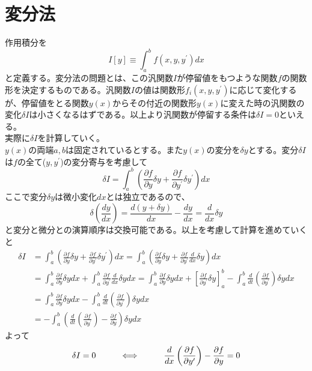 \documentclass{jsarticle}
\begin{document}
\section{変分法}
\noindent
作用積分を
\begin{equation}
I[y]\equiv\int_{a}^{b}f(x,y,y^{\prime})dx
\end{equation}
と定義する。変分法の問題とは、この汎関数\(I\)が停留値をもつような関数\(f\)の関数形を決定するものである。汎関数\(I\)の値は関数形\(f_{i}(x,y,y^{\prime})\)に応じて変化するが、停留値をとる関数\(y(x)\)からその付近の関数形\(y(x)\)に変えた時の汎関数の変化\(\delta I\)は小さくなるはずである。以上より汎関数が停留する条件は\(\delta I=0\)といえる。\\
実際に\(\delta I\)を計算していく。\\
\(y(x)\)の両端\(a,b\)は固定されているとする。また\(y(x)\)の変分を\(\delta y\)とする。変分\(\delta I\)は\(f\)の全て(\(y,y^{\prime}\))の変分寄与を考慮して
\[\delta I=\int_{a}^{b}\left(\frac{\partial f}{\partial y}\delta y+\frac{\partial f}{\partial y^{\prime}}\delta y^{\prime}\right)dx\]
ここで変分\(\delta y\)は微小変化\(dx\)とは独立であるので、
\[\delta\left(\frac{dy}{dx}\right)=\frac{d(y+\delta y)}{dx}-\frac{dy}{dx}=\frac{d}{dx}\delta y\]
と変分と微分との演算順序は交換可能である。以上を考慮して計算を進めていくと
\begin{align*}
\delta I&=\int_{a}^{b}\left(\frac{\partial f}{\partial y}\delta y+\frac{\partial f}{\partial y^{\prime}}\delta y^{\prime}\right)dx=\int_{a}^{b}\left(\frac{\partial f}{\partial y}\delta y+\frac{\partial f}{\partial y^{\prime}}\frac{d}{dx}\delta y\right)dx\\
&=\int_{a}^{b}\frac{\partial f}{\partial y}\delta ydx+\int_{a}^{b}\frac{\partial f}{\partial y^{\prime}}\frac{d}{dx}\delta ydx=\int_{a}^{b}\frac{\partial f}{\partial y}\delta ydx+\left[\frac{\partial f}{\partial y^{\prime}}\delta y\right]_{a}^{b}-\int_{a}^{b}\frac{d}{dt}\left(\frac{\partial f}{\partial y^{\prime}}\right)\delta ydx\\
&=\int_{a}^{b}\frac{\partial f}{\partial y}\delta ydx-\int_{a}^{b}\frac{d}{dt}\left(\frac{\partial f}{\partial y^{\prime}}\right)\delta ydx\\
&=-\int_{a}^{b}\left(\frac{d}{dt}\left(\frac{\partial f}{\partial y^{\prime}}\right)-\frac{\partial f}{\partial y}\right)\delta ydx
\end{align*}
よって
\[\delta I=0\hspace{10mm}\Longleftrightarrow\hspace{10mm}\frac{d}{dx}\left(\frac{\partial f}{\partial y^{\prime}}\right)-\frac{\partial f}{\partial y}=0\]
\end{document}
